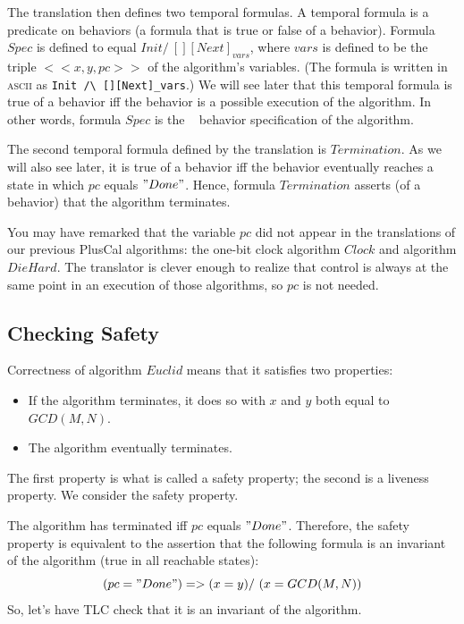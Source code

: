 \documentclass[fleqn,leqno]{article}
\begin{document}
The translation then defines two temporal formulas.  A temporal
formula is a predicate on behaviors (a formula that is true or false
of a behavior).  Formula $Spec$ is defined to equal
  $Init /\ [][Next]_{vars}$, where
$vars$ is defined to be the triple $<<x, y, pc>>$ of the algorithm's
variables.  
(The formula is written in \textsc{ascii} as \verb|Init /\ [][Next]_vars|.)
We will see later that this temporal formula is true of a
behavior iff the behavior is a possible execution of the algorithm.
In other words, formula $Spec$ is the \tlaplus\ 
behavior specification of the algorithm.

The second temporal formula defined by the translation is
$Termination$.  As we will also see later, it is true of a behavior
iff the behavior eventually reaches a state in which $pc$ equals
$"Done"$.  Hence, formula $Termination$ asserts (of a behavior) that
the algorithm terminates.

\pause

\noindent
You may have remarked that the variable $pc$ did not appear in the
translations of our previous PlusCal algorithms: the one-bit clock
algorithm $Clock$ and algorithm $DieHard$.  The translator is clever
enough to realize that control is always at the same point in an 
execution of those algorithms, so $pc$ is not needed.

\subsection{Checking Safety}

Correctness of algorithm $Euclid$ means that it satisfies two
properties:
\begin{itemize}
\item If the algorithm terminates, it does so with $x$ and $y$ both equal
to $GCD(M,N)$.

\item The algorithm eventually terminates.
\end{itemize}
The first property is what is called a
safety property; 
the second is a
liveness property.  We consider the safety property.

The algorithm has terminated iff $pc$ equals $"Done"$.  Therefore, the
safety property is equivalent to the assertion that the following
formula is an invariant of the algorithm (true in all reachable states):
  \[  (pc = "Done") => (x = y) /\ (x = GCD(M, N))
  \]
So, let's have TLC check that it is an invariant of the algorithm.
\end{document}
